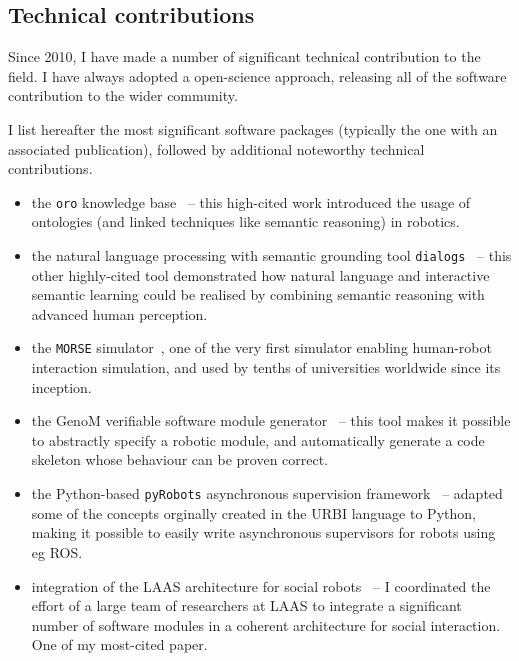 \subsection{Technical contributions}

Since 2010, I have made a number of significant technical contribution to the
field. I have always adopted a open-science approach, releasing all of the
software contribution to the wider community.

I list hereafter the most significant software packages (typically the one with an
associated publication), followed by additional noteworthy technical
contributions.

\begin{itemize}
    \item the \texttt{oro} knowledge base~\autocite{lemaignan2010oro} --
        this high-cited work introduced the usage of ontologies (and linked techniques like semantic
        reasoning) in robotics.

    \item the natural language processing with semantic grounding tool
        \texttt{dialogs}~\autocite{lemaignan2011grounding} -- this other
        highly-cited tool demonstrated how natural language and interactive
        semantic learning could be realised by combining semantic reasoning with
        advanced human perception.

    \item the \texttt{MORSE} simulator~\autocite{echeverria2011morse,
        lemaignan2012morse}, one of the very first simulator enabling
        human-robot interaction simulation, and used by tenths of universities
        worldwide since its inception.

    \item the GenoM verifiable software module
        generator~\autocite{mallet2010genom3} -- this tool makes it possible to
        abstractly specify a robotic module, and automatically generate a code
        skeleton whose behaviour can be proven correct.

    \item the Python-based \texttt{pyRobots} asynchronous supervision
        framework~\autocite{lemaignan2015pyrobots} -- adapted some of the concepts
        orginally created in the URBI language to Python, making it possible to
        easily write asynchronous supervisors for robots using eg ROS.

    \item integration of the LAAS architecture for social
        robots~\autocite{lemaignan2017artificial} -- I coordinated the effort of
        a large team of researchers at LAAS to integrate a significant number of
        software modules in a coherent architecture for social interaction. One
        of my most-cited paper.


\end{itemize}
